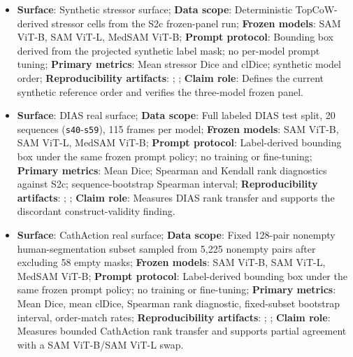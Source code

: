 \documentclass[11pt]{article}
\begin{document}
\begin{small}
\begin{itemize}
\item \textbf{Surface}: Synthetic stressor surface; \textbf{Data scope}: Deterministic TopCoW-derived stressor cells from the S2c frozen-panel run; \textbf{Frozen models}: SAM ViT-B, SAM ViT-L, MedSAM ViT-B; \textbf{Prompt protocol}: Bounding box derived from the projected synthetic label mask; no per-model prompt tuning; \textbf{Primary metrics}: Mean stressor Dice and clDice; synthetic model order; \textbf{Reproducibility artifacts}: ; ; \textbf{Claim role}: Defines the current synthetic reference order and verifies the three-model frozen panel.
\item \textbf{Surface}: DIAS real surface; \textbf{Data scope}: Full labeled DIAS test split, 20 sequences (\texttt{s40}-\texttt{s59}), 115 frames per model; \textbf{Frozen models}: SAM ViT-B, SAM ViT-L, MedSAM ViT-B; \textbf{Prompt protocol}: Label-derived bounding box under the same frozen prompt policy; no training or fine-tuning; \textbf{Primary metrics}: Mean Dice; Spearman and Kendall rank diagnostics against S2c; sequence-bootstrap Spearman interval; \textbf{Reproducibility artifacts}: ; ; \textbf{Claim role}: Measures DIAS rank transfer and supports the discordant construct-validity finding.
\item \textbf{Surface}: CathAction real surface; \textbf{Data scope}: Fixed 128-pair nonempty human-segmentation subset sampled from 5,225 nonempty pairs after excluding 58 empty masks; \textbf{Frozen models}: SAM ViT-B, SAM ViT-L, MedSAM ViT-B; \textbf{Prompt protocol}: Label-derived bounding box under the same frozen prompt policy; no training or fine-tuning; \textbf{Primary metrics}: Mean Dice, mean clDice, Spearman rank diagnostic, fixed-subset bootstrap interval, order-match rates; \textbf{Reproducibility artifacts}: ; ; \textbf{Claim role}: Measures bounded CathAction rank transfer and supports partial agreement with a SAM ViT-B/SAM ViT-L swap.
\end{itemize}
\end{small}
\end{document}
